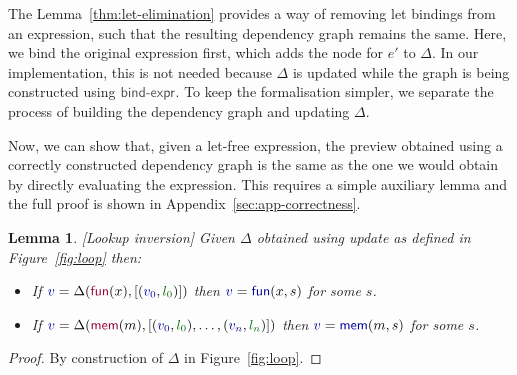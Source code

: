 \documentclass[acmsmall,anonymous,fleqn]{acmart}\settopmatter{printfolios=false,printccs=false,printacmref=false}
\newcounter{thc}
\theoremstyle{plain}
\newtheorem{lem}[thc]{Lemma}
\theoremstyle{definition}
\newcommand{\ident}[1]{\textnormal{\textcolor{idclr}{\sffamily #1}}}
\newcommand{\bndclr}[1]{\textcolor{kvdclr}{#1}}
\newcommand{\blblclr}[1]{\textcolor{numclr}{#1}}
\newcommand{\bnd}[1]{\textnormal{\textcolor{kvdclr}{\sffamily #1}}}
\newcommand{\bknd}[1]{\textnormal{\textcolor{prepclr}{\sffamily #1}}}
\begin{document}
The Lemma~\ref{thm:let-elimination} provides a way of removing let bindings from an expression,
such that the resulting dependency graph remains the same. Here, we bind the original expression
first, which adds the node for $e'$ to $\Delta$. In our implementation, this is not needed
because $\Delta$ is updated while the graph is being constructed using $\ident{bind-expr}$.
To keep the formalisation simpler, we separate the process of building the dependency graph
and updating $\Delta$.

Now, we can show that, given a let-free expression, the preview obtained using a correctly
constructed dependency graph is the same as the one we would obtain by directly evaluating the
expression. This requires a simple auxiliary lemma and the full proof is shown in
Appendix~\ref{sec:app-correctness}.

\begin{lem}
\label{thm:lemma-lookup}[Lookup inversion]
Given $\Delta$ obtained using \ident{update} as defined in Figure~\ref{fig:loop} then:
\begin{itemize}
\raggedright
\item[--] If $\bndclr{v}=\Delta(\bknd{fun}(x),[(\bndclr{v_0}, \blblclr{l_0})])$
then $\bndclr{v}=\bnd{fun}(x, s)$ for some $s$.
\item[--] If $\bndclr{v}=\Delta(\bknd{mem}(m),[(\bndclr{v_0}, \blblclr{l_0}), \ldots, (\bndclr{v_n}, \blblclr{l_n})])$
then $\bndclr{v}=\bnd{mem}(m, s)$ for some $s$.
\end{itemize}
\end{lem}
\begin{proof}
By construction of $\Delta$ in Figure~\ref{fig:loop}.
\end{proof}
\end{document}
